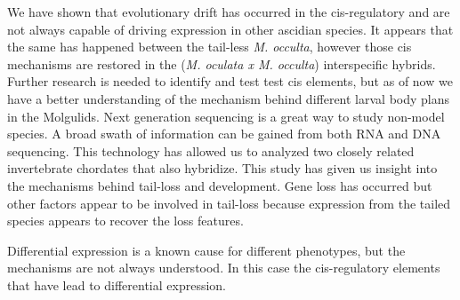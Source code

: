 We have shown that evolutionary drift has occurred in the cis-regulatory and are not always capable of driving expression in other ascidian species. It appears that the same has happened between the tail-less \textit{M. occulta}, however those cis mechanisms are restored in the (\textit{M. oculata x M. occulta}) interspecific hybrids. Further research is needed to identify and test test cis elements, but as of now we have a better understanding of the mechanism behind different larval body plans in the Molgulids. Next generation sequencing is a great way to study non-model species. A broad swath of information can be gained from both RNA and DNA sequencing. This technology has allowed us to analyzed two closely related invertebrate chordates that also hybridize. This study has given us insight into the mechanisms behind tail-loss and development. Gene loss has occurred but other factors appear to be involved in tail-loss because expression from the tailed species appears to recover the loss features. 

Differential expression is a known cause for different phenotypes, but the mechanisms are not always understood. In this case the cis-regulatory elements that have lead to differential expression.
